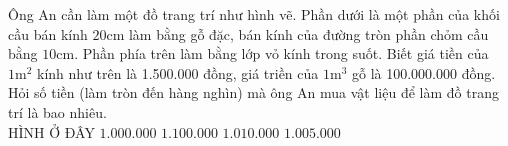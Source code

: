 \begin{ex}
	Ông An cần làm một đồ trang trí như hình vẽ. Phần dưới là một phần của khối cầu bán kính $ 20\mathrm{cm}$ làm bằng gỗ đặc, bán kính của đường tròn phần chỏm cầu bằng $ 10\mathrm{cm}$. Phần phía trên làm bằng lớp vỏ kính trong suốt. Biết giá tiền của $ 1\mathrm{m}^2$ kính như trên là 1.500.000 đồng, giá triền của $ 1\mathrm{m}^3$ gỗ là 100.000.000 đồng. Hỏi số tiền (làm tròn đến hàng nghìn) mà ông An mua vật liệu để làm đồ trang trí là bao nhiêu.\\
	{\color{red}HÌNH Ở ĐÂY}
	\choice
	{$ 1.000.000$}
	{$ 1.100.000$}
	{$ 1.010.000$}
	{\True $ 1.005.000$}
\end{ex}
